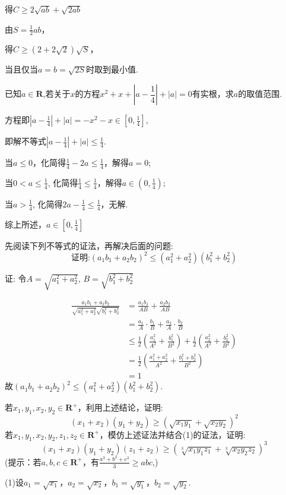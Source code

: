 \documentclass[cs4size,windows,a4paper,answers]{BHCexam}
\begin{document}
\begin{groups}
\begin{questions}[s]
\begin{solution}
得$C \ge  2\sqrt{ab}+\sqrt{2ab}$

由$S=\frac{1}{2}ab$，

得$C \ge (2+2\sqrt{2})\sqrt{S}$，


当且仅当$a=b=\sqrt{2S}$时取到最小值.
\end{solution}
\question[14] 已知$a\in\textbf{R}$,若关于$x$的方程$x^2+x+|a-\dfrac{1}{4}|+|a|=0$有实根，求$a$的取值范围.
\begin{solution}
\methodonly
方程即$|a-\frac{1}{4}|+|a|=-x^2-x\in[0,\frac{1}{4}]$,

即解不等式$|a-\frac{1}{4}|+|a| \le \frac{1}{4}$.

当$a\le 0$，化简得$\frac{1}{4}-2a \le \frac{1}{4}$，解得$a=0$;

当$0 \lt a\le \frac{1}{4}$, 化简得$\frac{1}{4} \le \frac{1}{4}$，解得$a\in(0,\frac{1}{4})$;

当$a \gt \frac{1}{4}$, 化简得$2a-\frac{1}{4}\le\frac{1}{4}$，无解.

综上所述，$a\in [0,\frac{1}{4}]$
\end{solution}
\question[14] 先阅读下列不等式的证法，再解决后面的问题:
\[
\text{证明:} (a_1b_1+a_2b_2)^2 \le  (a_1^2+a_2^2)(b_1^2+b_2^2)\]

证: 令$A=\sqrt{a_1^2+a_2^2}$, $B=\sqrt{b_1^2+b_2^2}$

\[
\begin{array}{rl}
\frac{a_1b_1+a_2b_2}{\sqrt{a_1^2+a_2^2}\sqrt{b_1^2+b_2^2}}& =\frac{a_1b_1}{AB}+\frac{a_2b_2}{AB}\\
& = \frac{a_1}{A}\cdot\frac{b_1}{B}+\frac{a_2}{A}\cdot\frac{b_2}{B} \\
& \le \frac{1}{2}(\frac{a_1^2}{A^2}+\frac{b_1^2}{B^2})+ \frac{1}{2}(\frac{a_2^2}{A^2}+\frac{b_2^2}{B^2})\\
& =\frac{1}{2}(\frac{a_1^2+a_2^2}{A^2}+\frac{b_1^2+b_2^2}{B^2})\\
& =1
\end{array}
\]
故$ (a_1b_1+a_2b_2)^2 \le  (a_1^2+a_2^2)(b_1^2+b_2^2)$.
\begin{subquestions}
    \subquestion 若$x_1,y_1,x_2,y_2\in\mathbf{R^+}$，利用上述结论，证明:\[
(x_1+x_2)(y_1+y_2) \ge (\sqrt{x_1y_1}+\sqrt{x_2y_2})^2
\]
    \subquestion 若$x_1,y_1,x_2,y_2,z_1,z_2\in\mathbf{R^+}$，模仿上述证法并结合(1)的证法，证明:\[
(x_1+x_2)(y_1+y_2)(z_1+z_2) \ge (\sqrt[3]{x_1y_1z_1}+\sqrt[3]{x_2y_2z_2})^3
\]
(提示：若$a,b,c\in\mathbf{R^+}$，有$\frac{a^3+b^3+c^3}{3}\ge abc$,)
\end{subquestions}
\begin{solution}
\methodonly
(1)设$a_1=\sqrt{x_1}$，$a_2=\sqrt{x_2}$，$b_1=\sqrt{y_1}$，$b_2=\sqrt{y_2}$.


\end{solution}
\end{questions}
\end{groups}
\end{document}
